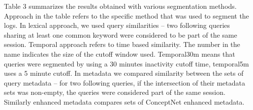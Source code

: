 \documentclass{acm_proc_article-sp} %
\begin{document}
\begin{table}[]
	\centering
	\caption{Initial parameters used in the experiment}
	\label{my-label}
\end{table}

Table 3 summarizes the results obtained with various segmentation
methods. Approach in the table refers to the specific
method that was used to segment the logs. In lexical
approach, we used query similarities – two following queries
sharing at least one common keyword were considered to be
part of the same session. Temporal approach refers to time
based similarity. The number in the name indicates the size
of the cutoff window used. Temporal30m means that queries
were segmented by using a 30 minutes inactivity cutoff time,
temporal5m uses a 5 minute cutoff. In metadata we compared
similarity between the sets of query metadata – for
two following queries, if the intersection of their metadata
sets was non-empty, the queries were considered part of the
same session. Similarly enhanced metadata compares sets of
ConceptNet enhanced metadata.
\end{document}
